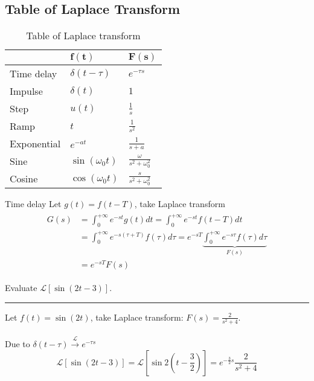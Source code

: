 \subsection{Table of Laplace Transform} 
\begin{table}[H]
    \centering
    \caption{Table of Laplace transform}
    \begin{tabular}{p{3cm} p{3cm} p{3cm}}
        \toprule
        & $\boldsymbol{f(t)}$ & $\boldsymbol{F(s)}$\\ 
        \midrule
        Time delay  &       $ \delta(t-\tau)$ &     $\displaystyle e^{-\tau s}$ \\ [2ex] 
        Impulse     &       $\delta(t)$  &          $1$ \\ [2ex] 
        Step        &       $u(t)$ &                $\displaystyle \frac{1}{s}$  \\  [2ex] 
        Ramp        &       $t$ &                   $\displaystyle \frac{1}{s^{2}}$  \\ [2ex] 
        Exponential &       $e^{-at}$ &             $\displaystyle \frac{1}{s+a}$  \\ [2ex] 
        Sine        &       $\sin(\omega_{0} t)$ &  $\displaystyle \frac{\omega}{s^{2}+\omega_{0}^{2}}$\\ [2ex]
        Cosine      &       $\cos(\omega_{0} t)$ &  $\displaystyle \frac{s}{s^{2}+\omega_{0}^{2}}$ \\ [1.6ex]
        \bottomrule
    \end{tabular}
\end{table}

\begin{dv}{Time delay}
Let $g(t)=f(t-T)$, take Laplace transform
\begin{align*}
\begin{split}
    G(s) &= \int_{0}^{+\infty}e^{-st}g(t)dt =  \int_{0}^{+\infty}e^{-st}f(t-T)dt\\
    &= \int_{0}^{+\infty}e^{-s(\tau+T)}f(\tau)d\tau = e^{-sT}\underbrace{\int_{0}^{+\infty}e^{-s\tau}f(\tau)d\tau}_{F(s)} \\
    &= e^{-sT}F(s)
\end{split}
\end{align*}
\end{dv}
\begin{ex}{}
Evaluate $\mathcal{L}[\sin(2t-3)]$.
\vspace{.3cm} \hrule \vspace{.3cm} 
Let $f(t) = \sin(2t)$, take Laplace transform: $\displaystyle F(s) = \frac{2}{s^{2}+4}$.\\\\
Due to $\delta(t-\tau)  \xrightarrow{\mathcal{L}} e^{-\tau s}$
\[\mathcal{L}[\sin(2t-3)] = \mathcal{L}[\sin2(t-\frac{3}{2})] = e^{-\frac{3}{2}s}\frac{2}{s^{2}+4}\]
\end{ex}

